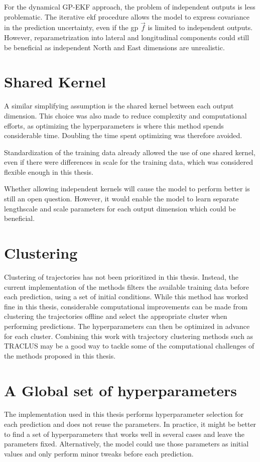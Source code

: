 For the dynamical GP-EKF approach, the problem of independent outputs is less problematic. The iterative \acrshort{ekf} procedure allows the model to express covariance in the prediction uncertainty, even if the \acrshort{gp} $\vec{f}$ is limited to independent outputs. However, reparametrization into lateral and longitudinal components could still be beneficial as independent North and East dimensions are unrealistic.  

\section{Shared Kernel}
A similar simplifying assumption is the shared kernel between each output dimension. This choice was also made to reduce complexity and computational efforts, as optimizing the hyperparameters is where this method spends considerable time. Doubling the time spent optimizing was therefore avoided. 

Standardization of the training data already allowed the use of one shared kernel, even if there were differences in scale for the training data, which was considered flexible enough in this thesis.

Whether allowing independent kernels will cause the model to perform better is still an open question. However, it would enable the model to learn separate lengthscale and scale parameters for each output dimension which could be beneficial. 

\section{Clustering}
Clustering of trajectories has not been prioritized in this thesis. Instead, the current implementation of the methods filters the available training data before each prediction, using a set of initial conditions. While this method has worked fine in this thesis, considerable computational improvements can be made from clustering the trajectories offline and select the appropriate cluster when performing predictions. The hyperparameters can then be optimized in advance for each cluster. Combining this work with trajectory clustering methods such as TRACLUS \cite{traclus} may be a good way to tackle some of the computational challenges of the methods proposed in this thesis.

\section{A Global set of hyperparameters}
The implementation used in this thesis performs hyperparameter selection for each prediction and does not reuse the parameters. In practice, it might be better to find a set of hyperparameters that works well in several cases and leave the parameters fixed. Alternatively, the model could use those parameters as initial values and only perform minor tweaks before each prediction. 

